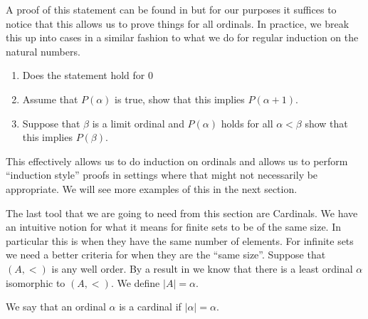 A proof of this statement can be found in \cite{Schimmerling2011-li} but for our
purposes it suffices to notice that this allows us to prove things for all
ordinals. In practice, we break this up into cases in a similar fashion to what
we do for regular induction on the natural numbers.

\begin{enumerate}
  \item Does the statement hold for $0$
  \item Assume that $P(\alpha)$ is true, show that this implies  $P(\alpha + 1)$.
  \item Suppose that $\beta$ is a limit ordinal and $P(\alpha)$ holds for all
    $\alpha < \beta$ show that this implies $P(\beta)$.
\end{enumerate}

This effectively allows us to do induction on ordinals and allows us to perform
``induction style'' proofs in settings where that might not necessarily be
appropriate. We will see more examples of this in the next section.

The last tool that we are going to need from this section are Cardinals. We
have an intuitive notion for what it means for finite sets to be of the same
size. In particular this is when they have the same number of elements. For
infinite sets we need a better criteria for when they are the ``same size''.
Suppose that $(A, <)$ is any well order. By a result in
\cite{Schimmerling2011-li} we know that there is a least ordinal $\alpha$ 
isomorphic to $(A, <)$. We define $|A| = \alpha$.

\begin{defn}[Cardinal]
  We say that an ordinal $\alpha$ is a cardinal if $|\alpha| = \alpha$.
\end{defn}

